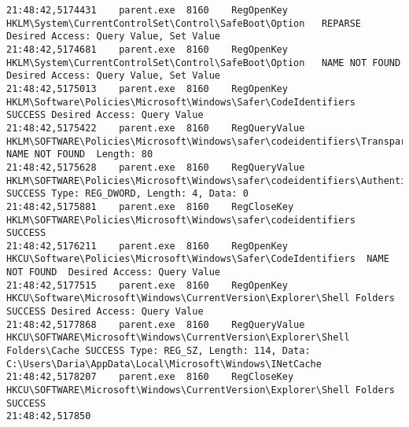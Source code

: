\begin{verbatim}
21:48:42,5174431	parent.exe	8160	RegOpenKey	HKLM\System\CurrentControlSet\Control\SafeBoot\Option	REPARSE	Desired Access: Query Value, Set Value
21:48:42,5174681	parent.exe	8160	RegOpenKey	HKLM\System\CurrentControlSet\Control\SafeBoot\Option	NAME NOT FOUND	Desired Access: Query Value, Set Value
21:48:42,5175013	parent.exe	8160	RegOpenKey	HKLM\Software\Policies\Microsoft\Windows\Safer\CodeIdentifiers	SUCCESS	Desired Access: Query Value
21:48:42,5175422	parent.exe	8160	RegQueryValue	HKLM\SOFTWARE\Policies\Microsoft\Windows\safer\codeidentifiers\TransparentEnabled	NAME NOT FOUND	Length: 80
21:48:42,5175628	parent.exe	8160	RegQueryValue	HKLM\SOFTWARE\Policies\Microsoft\Windows\safer\codeidentifiers\AuthenticodeEnabled	SUCCESS	Type: REG_DWORD, Length: 4, Data: 0
21:48:42,5175881	parent.exe	8160	RegCloseKey	HKLM\SOFTWARE\Policies\Microsoft\Windows\safer\codeidentifiers	SUCCESS	
21:48:42,5176211	parent.exe	8160	RegOpenKey	HKCU\Software\Policies\Microsoft\Windows\Safer\CodeIdentifiers	NAME NOT FOUND	Desired Access: Query Value
21:48:42,5177515	parent.exe	8160	RegOpenKey	HKCU\Software\Microsoft\Windows\CurrentVersion\Explorer\Shell Folders	SUCCESS	Desired Access: Query Value
21:48:42,5177868	parent.exe	8160	RegQueryValue	HKCU\SOFTWARE\Microsoft\Windows\CurrentVersion\Explorer\Shell Folders\Cache	SUCCESS	Type: REG_SZ, Length: 114, Data: C:\Users\Daria\AppData\Local\Microsoft\Windows\INetCache
21:48:42,5178207	parent.exe	8160	RegCloseKey	HKCU\SOFTWARE\Microsoft\Windows\CurrentVersion\Explorer\Shell Folders	SUCCESS	
21:48:42,517850
\end{verbatim}
